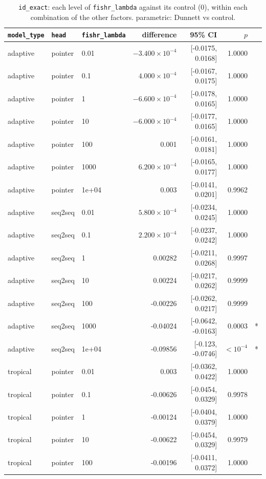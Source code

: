 \documentclass[10pt]{article}
\begin{document}
{\small
\begin{longtable}{lllrrrl}
\caption{\texttt{id\_exact}: each level of \texttt{fishr\_lambda} against its control (0), within each combination of the other factors. parametric: Dunnett vs control.}\label{tab:control-id_exact}\\
\toprule
\texttt{model\_type} & \texttt{head} & \texttt{fishr\_lambda} & difference & 95\% CI & $p$ & \\
\midrule
\endhead
adaptive & pointer & 0.01 & $-3.400\times10^{-4}$ & [-0.0175, 0.0168] & 1.0000 & \\
adaptive & pointer & 0.1 & $4.000\times10^{-4}$ & [-0.0167, 0.0175] & 1.0000 & \\
adaptive & pointer & 1 & $-6.600\times10^{-4}$ & [-0.0178, 0.0165] & 1.0000 & \\
adaptive & pointer & 10 & $-6.000\times10^{-4}$ & [-0.0177, 0.0165] & 1.0000 & \\
adaptive & pointer & 100 & 0.001 & [-0.0161, 0.0181] & 1.0000 & \\
adaptive & pointer & 1000 & $6.200\times10^{-4}$ & [-0.0165, 0.0177] & 1.0000 & \\
adaptive & pointer & 1e+04 & 0.003 & [-0.0141, 0.0201] & 0.9962 & \\
adaptive & seq2seq & 0.01 & $5.800\times10^{-4}$ & [-0.0234, 0.0245] & 1.0000 & \\
adaptive & seq2seq & 0.1 & $2.200\times10^{-4}$ & [-0.0237, 0.0242] & 1.0000 & \\
adaptive & seq2seq & 1 & 0.00282 & [-0.0211, 0.0268] & 0.9997 & \\
adaptive & seq2seq & 10 & 0.00224 & [-0.0217, 0.0262] & 0.9999 & \\
adaptive & seq2seq & 100 & -0.00226 & [-0.0262, 0.0217] & 0.9999 & \\
adaptive & seq2seq & 1000 & -0.04024 & [-0.0642, -0.0163] & 0.0003 & *\\
adaptive & seq2seq & 1e+04 & -0.09856 & [-0.123, -0.0746] & $<10^{-4}$ & *\\
tropical & pointer & 0.01 & 0.003 & [-0.0362, 0.0422] & 1.0000 & \\
tropical & pointer & 0.1 & -0.00626 & [-0.0454, 0.0329] & 0.9978 & \\
tropical & pointer & 1 & -0.00124 & [-0.0404, 0.0379] & 1.0000 & \\
tropical & pointer & 10 & -0.00622 & [-0.0454, 0.0329] & 0.9979 & \\
tropical & pointer & 100 & -0.00196 & [-0.0411, 0.0372] & 1.0000 & \\

\end{longtable}}
\end{document}
